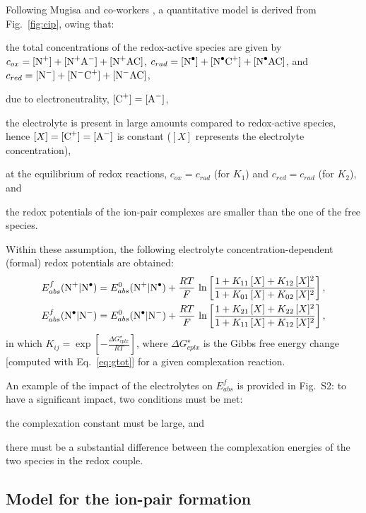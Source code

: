\documentclass[review,preprint]{elsarticle}
\begin{document}
Following Mugisa and co-workers \cite{mugisaEffectIonparingKinetics2024}, a quantitative model is derived from Fig.~\ref{fig:cip}, owing that: \begin{inparaenum}[(i)]
	\item the total concentrations of the redox-active species are given by $c_{ox} = [\ce{N+}] + [\ce{N+A-}] + [\ce{N+AC}]$, $c_{rad} = [\ce{N^.}] + [\ce{N^.C+}] + [\ce{N^.AC}]$, and $c_{red} =  [\ce{N-}] + [\ce{N^-C+}] + [\ce{N^-AC}]$,
	\item due to electroneutrality, $ [\ce{C+}] = [\ce{A-}] $,
	\item the electrolyte is present in large amounts compared to redox-active species, hence $[X] = [\ce{C+}] = [\ce{A-}] $ is constant ($[X]$ represents the electrolyte concentration),
	\item at the equilibrium of redox reactions, $c_{ox} = c_{rad}$ (for $K_1$) and $c_{red} = c_{rad}$ (for $K_2$), and
	\item the redox potentials of the ion-pair complexes are smaller than the one of the free species.
\end{inparaenum}
Within these assumption, the following electrolyte concentration-dependent (formal) redox potentials are obtained:\begin{align}
	E^f_{abs}(\ce{N+|N^.}) &= E^0_ {abs}(\ce{N+|N^.})+\frac{RT}{F}\,\ln\left[\frac{1+K_{11}\,[X]+K_{12}\,[X]^2}{1+K_{01}\,[X]+K_{02}\,[X]^2}\right],\label{eq:ef1}\\
	E^f_{abs}(\ce{N^.|N-}) &= E^0_ {abs}(\ce{N^.|N-})+\frac{RT}{F}\,\ln\left[\frac{1+K_{21}\,[X]+K_{22}\,[X]^2}{1+K_{11}\,[X]+K_{12}\,[X]^2}\right],\label{eq:ef2}
\end{align}
in which $K_{ij}= \exp\left[-\frac{\Delta G_{cplx}^\star}{RT}\right]$, where $\Delta G_{cplx}^\star$ is the Gibbs free energy change [computed with Eq.~\eqref{eq:gtot}] for a given complexation reaction.

An example of the impact of the electrolytes on $E^f_{abs}$ is provided in Fig.~S2: to have a significant impact, two conditions must be met: \begin{inparaenum}[(i)]
	\item the complexation constant must be large, and
	\item there must be a substantial difference between the complexation energies of the two species in the redox couple.
\end{inparaenum}

\subsection{Model for the ion-pair formation}
\end{document}
